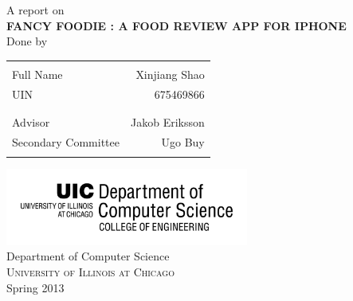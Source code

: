 \begin{titlepage}

\begin{center}

\textup{\large A report on}\\[1.0cm]

\uppercase{\Large \textbf {Fancy Foodie : A Food Review App for iPhone}}\\[3.0cm]

\normalsize Done by \\
\begin{table}[h]
\centering
\begin{tabular}{lr}\hline \\
Full Name & Xinjiang Shao \\ 
UIN & 675469866 \\ \\ \hline
\\
Advisor & Jakob Eriksson \\
Secondary Committee & Ugo Buy \\ \\ \hline 
\end{tabular}
\end{table}

\vfill

\includegraphics[width=0.60\textwidth]{./uic-logo}\\[1cm]
\LARGE{Department of Computer Science}\\
\normalsize
\textsc{University of Illinois at Chicago}\\
\vspace{0.5cm}
Spring 2013

\end{center}

\end{titlepage}
